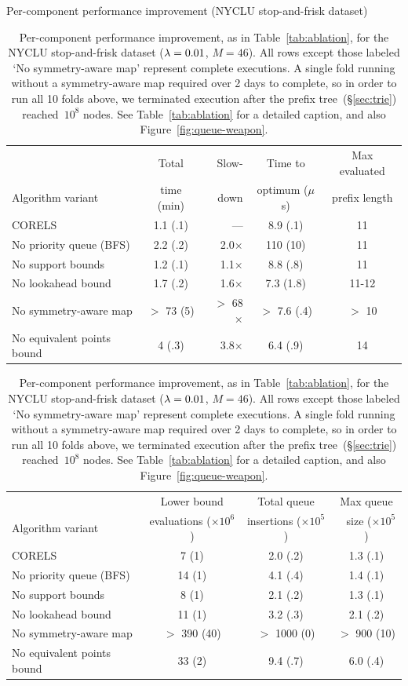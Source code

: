 \begin{table}[t!]
\centering
Per-component performance improvement (NYCLU stop-and-frisk dataset) \\
\vspace{1mm}
\begin{tabular}{l | c  r | c | c}
& Total & Slow- & Time to & Max evaluated \\
Algorithm variant & time (min) & down & optimum ($\mu$s) & prefix length \\
\hline
CORELS & 1.1 (.1) & --- & 8.9 (.1) & 11 \\
No priority queue (BFS) & 2.2 (.2) & 2.0$\times$ & 110 (10) & 11 \\
No support bounds & 1.2 (.1) & 1.1$\times$ & 8.8 (.8) & 11 \\
No lookahead bound & 1.7 (.2) & 1.6$\times$ & 7.3 (1.8) & 11-12 \\
No symmetry-aware map & $>$ 73 (5) & $>$ 68$\times$ & $>$ 7.6 (.4) & $>$ 10 \\
No equivalent points bound & 4 (.3) & 3.8$\times$ & 6.4 (.9) & 14 \\
\hline
\end{tabular}
\begin{tabular}{l | c | c | c}
\hline
 & Lower bound & Total queue &  Max queue \\
Algorithm variant & evaluations ($\times 10^6$) & insertions ($\times 10^5$) &~ size ($\times 10^5$) \\
\hline
CORELS & 7 (1) & 2.0 (.2) & 1.3 (.1) \\
No priority queue (BFS) & 14 (1) & 4.1 (.4) & 1.4 (.1) \\
No support bounds & 8 (1) & 2.1 (.2) & 1.3 (.1) \\
No lookahead bound & 11 (1) & 3.2 (.3) & 2.1 (.2) \\
No symmetry-aware map & $>$ 390 (40) & $>$ 1000 (0) & $>$ 900 (10) \\
No equivalent points bound & 33 (2) & 9.4 (.7) & 6.0 (.4) \\
\end{tabular}
\caption{Per-component performance improvement, as in Table~\ref{tab:ablation},
for the NYCLU stop-and-frisk dataset (${{\lambda} = 0.01}$, ${M = 46}$).
%
All rows except those labeled `No symmetry-aware map' represent complete executions.
%
A single fold running without a symmetry-aware map required over 2 days to complete,
so in order to run all 10 folds above, we terminated execution after the prefix tree~(\S\ref{sec:trie})
reached~$10^8$ nodes.
%
See Table~\ref{tab:ablation} for a detailed caption,
and also Figure~\ref{fig:queue-weapon}.
}
\vspace{4mm}
\label{tab:ablation-weapon}
\end{table}
